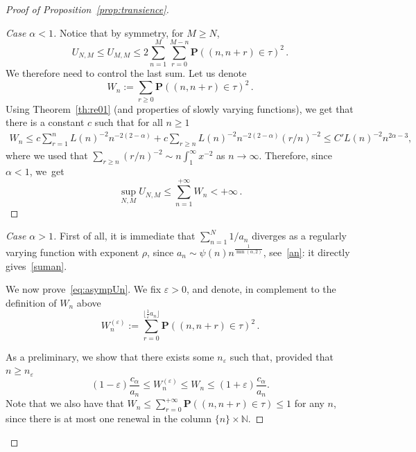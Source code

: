 \documentclass[10pt]{amsart}
\theoremstyle{definition}\newtheorem{defi}[theo]{Definition}\newtheorem{rema}[theo]{Remark}\newtheorem{exam}[theo]{Example}\newtheorem{exem}[theo]{Example}\newtheorem{nota}[theo]{Notation}
\newenvironment{step}[1]{\begin{proof}[{#1}]}{\let\qed\relax\end{proof}}
\newcommand{\ga}{\alpha}
\newcommand{\gep}{\varepsilon}
\newcommand{\bP}{\ensuremath{\mathbf{P}}}
\newcommand{\bbN}{\ensuremath{\mathbb{N}}}
\newenvironment{proofc}[1][\proofname]{\begin{proof}[{#1}]}{\end{proof}}
\begin{document}
\begin{appendix}
\begin{proofc}[Proof of Proposition~\ref{prop:transience}]

\begin{step}{Case $\ga<1$}
Notice that by symmetry, for $M\geq N$,
\[
U_{N,M} \leq U_{M,M} \leq 2 \sum_{n=1}^M \sum_{r=0}^{M-n} \bP((n,n+r) \in\tau)^2\,.
\]
We therefore need to control the last sum. Let us denote
\[
W_n:=\sum_{r\geq 0} \bP((n,n+r) \in\tau)^2\,.
\]
Using Theorem~\ref{th:re01} (and properties of slowly varying functions), we get that there is a constant $c$ such that for all $n\geq 1$
\begin{align*}
W_n \leq c\sum_{r=1}^n L(n)^{-2} n^{-2(2-\ga)} + c\sum_{r\geq n} L(n)^{-2} n^{-2(2-\ga)} (r/n)^{-2}
\leq C' L(n)^{-2} n^{ 2\ga -3},
\end{align*}
where we used that $\sum_{r\geq n} (r/n)^{-2} \sim n \int_1^{\infty} x^{-2}$ as $n\to\infty$. Therefore, since $\ga<1$, we~get
\[
\sup_{N,M} U_{N,M} \leq \sum_{n=1}^{+\infty} W_n <+\infty\,.
\]
\end{step}

\begin{step}{Case $\ga > 1$}
First of all, it is immediate that $\sum_{n=1}^N 1/a_n$ diverges as a regularly varying function with exponent $\rho$, since $a_n \sim \psi(n) n^{\frac{1}{\min(\ga,2)}}$, see~\eqref{an}: it directly gives~\eqref{suman}.



We now prove~\eqref{eq:asympUn}. We fix $\gep>0$, and denote, in complement to the definition of $W_n$ above
\[
W_n^{(\gep)} := \sum_{r = 0}^{\lfloor \frac1\gep a_n \rfloor} \bP((n,n+r) \in \tau)^2\,.
\]


As a preliminary, we show that there exists some $n_\gep$ such that, provided that~$n\geq n_{\gep}$
\begin{equation}\label{eq:sumk}
(1-\gep) \frac{c_{\ga}}{a_n} \leq W_n^{(\gep)} \leq W_n \leq (1+\gep) \frac{c_{\ga}}{a_n}.
\end{equation}
Note that we also have that $W_n \leq \sum_{r = 0}^{+\infty} \bP((n,n+r) \in \tau) \leq 1$ for any $n$, since there is at most one renewal in the column $\{n\}\times \bbN$.



\end{step}
\end{proofc}
\end{appendix}
\end{document}
